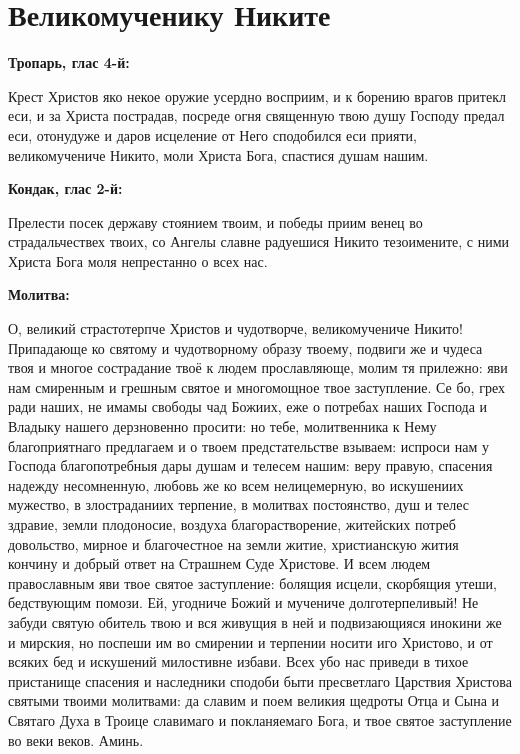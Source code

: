  

\section{Великомученику Никите}
 
\bfseries Тропарь, глас 4-й:\normalfont{}


Крест Христов яко некое оружие усердно восприим, и к борению врагов притекл еси, и за Христа пострадав, посреде огня священную твою душу Господу предал еси, отонудуже и даров исцеление от Него сподобился еси прияти, великомучениче Никито, моли Христа Бога, спастися душам нашим.


\medskip
\bfseries Кондак, глас 2-й:\normalfont{}

Прелести посек державу стоянием твоим, и победы приим венец во страдальчествех твоих, со Ангелы славне радуешися Никито тезоимените, с ними Христа Бога моля непрестанно о всех нас.


\medskip
\bfseries Молитва:\normalfont{}


О, великий страстотерпче Христов и чудотворче, великомучениче Никито! Припадающе ко святому и чудотворному образу твоему, подвиги же и чудеса твоя и многое сострадание твоё к людем прославляюще, молим тя прилежно: яви нам смиренным и грешным святое и многомощное твое заступление. Се бо, грех ради наших, не имамы свободы чад Божиих, еже о потребах наших Господа и Владыку нашего дерзновенно просити: но тебе, молитвенника к Нему благоприятнаго предлагаем и о твоем предстательстве взываем: испроси нам у Господа благопотребныя дары душам и телесем нашим: веру правую, спасения надежду несомненную, любовь же ко всем нелицемерную, во искушениих мужество, в злостраданиих терпение, в молитвах постоянство, душ и телес здравие, земли плодоносие, воздуха благорастворение, житейских потреб довольство, мирное и благочестное на земли житие, христианскую жития кончину и добрый ответ на Страшнем Суде Христове. И всем людем православным яви твое святое заступление: болящия исцели, скорбящия утеши, бедствующим помози. Ей, угодниче Божий и мучениче долготерпеливый! Не забуди святую обитель твою и вся живущия в ней и подвизающияся инокини же и мирския, но поспеши им во смирении и терпении носити иго Христово, и от всяких бед и искушений милостивне избави. Всех убо нас приведи в тихое пристанище спасения и наследники сподоби быти пресветлаго Царствия Христова святыми твоими молитвами: да славим и поем великия щедроты Отца и Сына и Святаго Духа в Троице славимаго и покланяемаго Бога, и твое святое заступление во веки веков. Аминь. 

